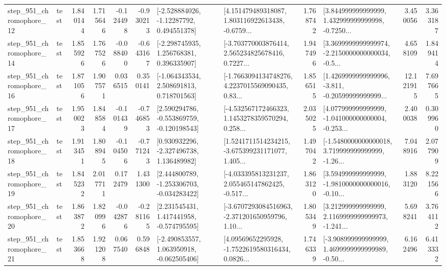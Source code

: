 \begin{tabular}{llrrrrllrlrr}
  step\_951\_chromophore\_12 &      test &      1.840144 &    1.715646 &     -0.124498 & -0.930213 &    [-2.528884026, -1.12287792, 0.494551378] &  [4.151479489318087, 1.803116922613438, -0.6759... &       1.768742 &  [3.844999999999999, 1.432999999999998, -0.7250... &            3.450056 &          3.363187 \\
  step\_951\_chromophore\_14 &      test &      1.855926 &    1.767526 &     -0.088400 & -0.643167 &    [-2.298745935, 1.256768381, 0.396335907] &  [-3.703770003876414, 2.565234825678416, 0.7227... &       1.947496 &  [3.3699999999999974, -2.2150000000000034, -0.5... &            4.658109 &          1.849414 \\
  step\_951\_chromophore\_16 &      test &      1.871056 &    1.907571 &      0.036515 &  0.350141 &    [-1.064343534, 2.508691813, 0.718701563] &  [-1.7663094134748276, 4.2237015569090435, 0.83... &       1.856515 &  [1.4269999999999996, -3.811, -0.20599999999999... &           12.121915 &          7.697665 \\
  step\_951\_chromophore\_17 &      test &      1.950023 &    1.848584 &     -0.101439 & -0.746853 &   [2.590294786, -0.553869759, -0.120198543] &  [-4.532567172466323, 1.1453278359570294, 0.258... &       2.035025 &  [4.077999999999999, -1.041000000000004, -0.253... &            2.400038 &          0.309960 \\
  step\_951\_chromophore\_18 &      test &      1.913451 &    1.808945 &     -0.104506 & -0.771243 &    [0.930932296, -2.327496738, 1.136489982] &  [1.5241711514234215, -3.675399231171077, 1.405... &       1.497042 &  [-1.5480000000000018, 3.719999999999999, -1.26... &            7.048916 &          2.077909 \\
  step\_951\_chromophore\_19 &      test &      1.845232 &    2.017711 &      0.172479 &  1.431300 &   [2.444800789, -1.253306703, -0.034283422] &  [-4.033395813231237, 2.055465147862425, -0.517... &       1.863120 &  [3.594999999999999, -1.9810000000000016, -0.10... &            1.883120 &          8.221566 \\
  step\_951\_chromophore\_20 &      test &      1.863872 &    1.820996 &     -0.042876 & -0.281165 &    [2.231545431, 1.417441958, -0.574795595] &  [-3.6707293084516963, -2.371201650959796, 1.10... &       1.805349 &  [3.212999999999999, 2.1169999999999973, -1.241... &            5.698241 &          3.764112 \\
  step\_951\_chromophore\_21 &      test &      1.853668 &    1.921208 &      0.067540 &  0.596848 &   [-2.490853557, 1.063950918, -0.062505406] &  [4.09569652295928, -1.7522619580316434, 0.0826... &       1.746339 &  [-3.908999999999999, 1.4699999999999989, -0.50... &            6.162496 &          6.413332 \\

\end{tabular}
